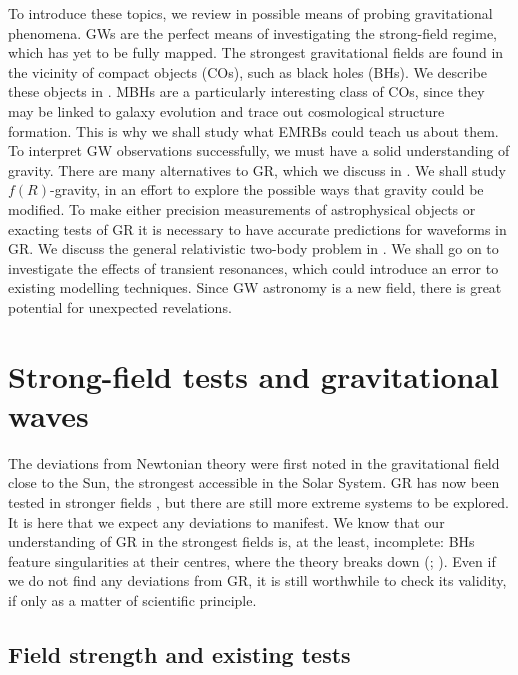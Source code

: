 To introduce these topics, we review in  possible means of probing gravitational phenomena. GWs are the perfect means of investigating the strong-field regime, which has yet to be fully mapped. The strongest gravitational fields are found in the vicinity of compact objects (COs), such as black holes (BHs). We describe these objects in . MBHs are a particularly interesting class of COs, since they may be linked to galaxy evolution and trace out cosmological structure formation. This is why we shall study what EMRBs could teach us about them. To interpret GW observations successfully, we must have a solid understanding of gravity. There are many alternatives to GR, which we discuss in . We shall study $f(R)$-gravity, in an effort to explore the possible ways that gravity could be modified. To make either precision measurements of astrophysical objects or exacting tests of GR it is necessary to have accurate predictions for waveforms in GR. We discuss the general relativistic two-body problem in . We shall go on to investigate the effects of transient resonances, which could introduce an error to existing modelling techniques. Since GW astronomy is a new field, there is great potential for unexpected revelations.

\section{Strong-field tests and gravitational waves}\label{sec:strong-field}

The deviations from Newtonian theory were first noted in the gravitational field close to the Sun, the strongest accessible in the Solar System. GR has now been tested in stronger fields \citep{Will2006}, but there are still more extreme systems to be explored. It is here that we expect any deviations to manifest. We know that our understanding of GR in the strongest fields is, at the least, incomplete: BHs feature singularities at their centres, where the theory breaks down (\citealt[section 34.6]{Misner1973}; \citealt[chapter 9]{Wald1984}). Even if we do not find any deviations from GR, it is still worthwhile to check its validity, if only as a matter of scientific principle.

\subsection{Field strength and existing tests}\label{sec:exist-tests}

